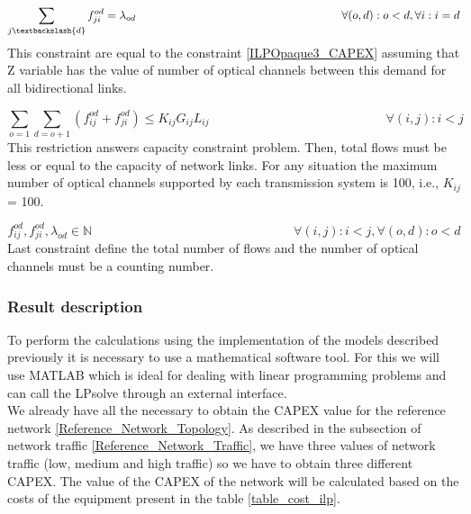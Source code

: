 \begin{equation}
\sum_{j\textbackslash \{d\}} f_{ji}^{od} = \lambda_{od}  \qquad \qquad \qquad \qquad \qquad \qquad \qquad \qquad \qquad
\forall(o,d) : o < d, \forall i: i = d
\label{ILPTransp3_surv}
\end{equation}
\noindent
This constraint are equal to the constraint \ref{ILPOpaque3_CAPEX} assuming that Z variable has the value of number of optical channels between this demand for all bidirectional links.

\begin{equation}
\sum_{o=1} \sum_{d=o+1} \left(f_{ij}^{od} + f_{ji}^{od}\right) \leq K_{ij} G_{ij} L_{ij} \qquad \qquad \qquad \qquad \qquad \qquad \qquad
\forall(i,j) : i < j
\label{ILPTransp4_surv}
\end{equation}
\noindent
This restriction answers capacity constraint problem. Then, total flows must be less or equal to the capacity of network links. For any situation the maximum number of optical channels supported by each transmission system is 100, i.e., $K_{ij}$ = 100.

\begin{equation}
f_{ij}^{od} , f_{ji}^{od} , \lambda_{od} \in \mathbb{N}   \qquad \qquad \qquad \qquad \qquad \qquad \qquad \qquad
\forall(i,j) : i < j, \forall(o,d) : o < d
\label{ILPTransp5_surv}
\end{equation}
\noindent
Last constraint define the total number of flows and the number of optical channels must be a counting number.\\


\subsubsection{Result description}

To perform the calculations using the implementation of the models described previously it is necessary to use a mathematical software tool. For this we will use MATLAB which is ideal for dealing with linear programming problems and can call the LPsolve through an external interface.\\
We already have all the necessary to obtain the CAPEX value for the reference network \ref{Reference_Network_Topology}. As described in the subsection of network traffic \ref{Reference_Network_Traffic}, we have three values of network traffic (low, medium and high traffic) so we have to obtain three different CAPEX.
The value of the CAPEX of the network will be calculated based on the costs of the equipment present in the table \ref{table_cost_ilp}.


